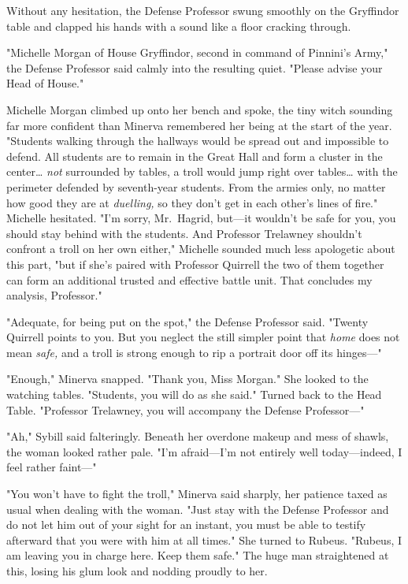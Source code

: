 Without any hesitation, the Defense Professor swung smoothly on the Gryffindor 
table and clapped his hands with a sound like a floor cracking through.

"Michelle Morgan of House Gryffindor, second in command of Pinnini's Army," the 
Defense Professor said calmly into the resulting quiet. "Please advise your 
Head of House."

Michelle Morgan climbed up onto her bench and spoke, the tiny witch sounding 
far more confident than Minerva remembered her being at the start of the year. 
"Students walking through the hallways would be spread out and impossible to 
defend. All students are to remain in the Great Hall and form a cluster in the 
center{\ldots} \emph{not} surrounded by tables, a troll would jump right over 
tables{\ldots} with the perimeter defended by seventh-year students. From the 
armies only, no matter how good they are at \emph{duelling,} so they don't get 
in each other's lines of fire." Michelle hesitated. "I'm sorry, Mr.~Hagrid, 
but---it wouldn't be safe for you, you should stay behind with the students. 
And Professor Trelawney shouldn't confront a troll on her own either," Michelle 
sounded much less apologetic about this part, "but if she's paired with 
Professor Quirrell the two of them together can form an additional trusted and 
effective battle unit. That concludes my analysis, Professor."

"Adequate, for being put on the spot," the Defense Professor said. "Twenty 
Quirrell points to you. But you neglect the still simpler point that 
\emph{home} does not mean \emph{safe,} and a troll is strong enough to rip a 
portrait door off its hinges---"

"Enough," Minerva snapped. "Thank you, Miss Morgan." She looked to the watching 
tables. "Students, you will do as she said." Turned back to the Head Table. 
"Professor Trelawney, you will accompany the Defense Professor---"

"Ah," Sybill said falteringly. Beneath her overdone makeup and mess of shawls, 
the woman looked rather pale. "I'm afraid---I'm not entirely well 
today---indeed, I feel rather faint---"

"You won't have to fight the troll," Minerva said sharply, her patience taxed 
as usual when dealing with the woman. "Just stay with the Defense Professor and 
do not let him out of your sight for an instant, you must be able to testify 
afterward that you were with him at all times." She turned to Rubeus. 
"Rubeus, I am leaving you in charge here. Keep them safe." The huge man 
straightened at this, losing his glum look and nodding proudly to her.

